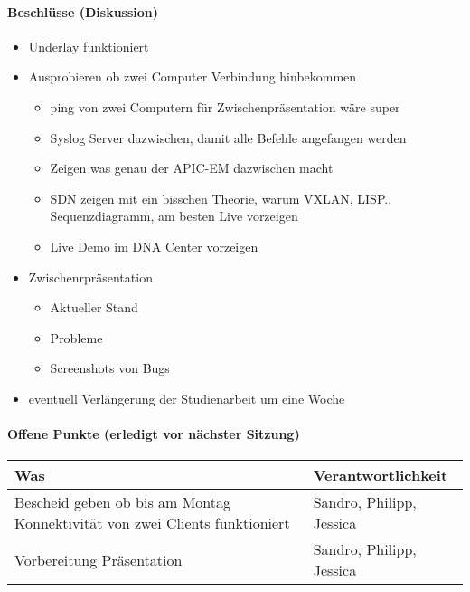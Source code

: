 \paragraph{Beschlüsse (Diskussion)}
\begin{itemize}	
	\item Underlay funktioniert
	\item Ausprobieren ob zwei Computer Verbindung hinbekommen
	\begin{itemize}
		\item ping von zwei Computern für Zwischenpräsentation wäre super
		\item Syslog Server dazwischen, damit alle Befehle angefangen werden
		\item Zeigen was genau der APIC-EM dazwischen macht
		\item SDN zeigen mit ein bisschen Theorie, warum VXLAN, LISP.. Sequenzdiagramm, am besten Live vorzeigen
		\item Live Demo im DNA Center vorzeigen
	\end{itemize}
	\item Zwischenrpräsentation
	\begin{itemize}
		\item Aktueller Stand
		\item Probleme
		\item Screenshots von Bugs
	\end{itemize}
	\item eventuell Verlängerung der Studienarbeit um eine Woche
\end{itemize}

\paragraph{Offene Punkte (erledigt vor nächster Sitzung)} \mbox{}

\begin{table}[H]
	\centering
	\begin{tabularx}{\textwidth}{X | p{4.5cm}}
		\rowcolor{gray!50}
		\textbf{Was} & \textbf{Verantwortlichkeit} \\
		\hline
		Bescheid geben ob bis am Montag Konnektivität von zwei Clients funktioniert & Sandro, Philipp, Jessica \\
		Vorbereitung Präsentation & Sandro, Philipp, Jessica \\
	\end{tabularx}
	\label{tab:my-label}
\end{table}

